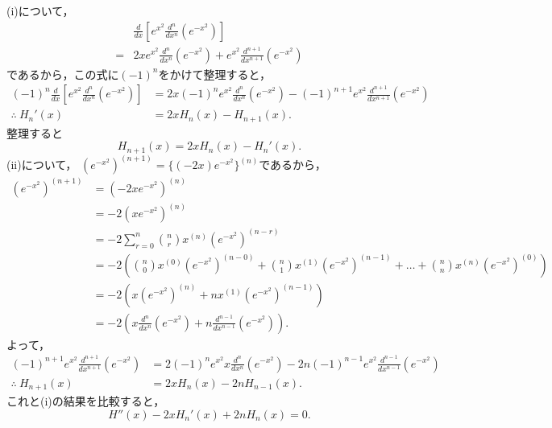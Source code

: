\begin{tproof}
    (i)について，
    \begin{align*}
          & \frac{d}{dx} \left[ e^{x^2} \frac{d^n}{dx^n} (e^{-x^2} )\right]                      \\
        = & 2x e^{x^2} \frac{d^n}{dx^n} (e^{-x^2}) + e^{x^2} \frac{d^{n+1}}{dx^{n+1}} (e^{-x^2})
    \end{align*}
    であるから，この式に$(-1)^n$をかけて整理すると，
    \begin{align*}
        (-1)^n \frac{d}{dx} \left[ e^{x^2} \frac{d^n}{dx^n} (e^{-x^2} )\right] & = 2x(-1)^n e^{x^2} \frac{d^n}{dx^n} (e^{-x^2}) -(-1)^{n+1} e^{x^2} \frac{d^{n+1}}{dx^{n+1}} (e^{-x^2}) \\
        \therefore ~ H_n ' (x)                                                 & = 2x H_n(x) - H_{n+1}(x).
    \end{align*}
    整理すると
    \[
        H_{n+1}(x) =  2x H_n(x)-H_n'(x).
    \]
    (ii)について，
    $ (e^{-x^2})^{(n+1)} = \{ (-2x)e^{-x^2} \}^{(n)}$であるから，
    \begin{align*}
        (e^{-x^2})^{(n+1)} & = (-2xe^{-x^2})^{(n)}                                                                                                                                  \\
                           & = -2 (xe^{-x^2})^{(n)}                                                                                                                                 \\
                           & = -2 \sum_{r=0}^{n} \binom{n}{r} x^{(n)} (e^{-x^2})^{(n-r)}                                                                                            \\
                           & = -2 \left ( \binom{n}{0} x^{(0)} (e^{-x^2})^{(n-0)} + \binom{n}{1} x^{(1)} (e^{-x^2})^{(n-1)} + \dots + \binom{n}{n} x^{(n)} (e^{-x^2})^{(0)} \right) \\
                           & = -2 \left(  x (e^{-x^2})^{(n)} + n x^{(1)} (e^{-x^2})^{(n-1)} \right)                                                                                 \\
                           & = -2 \left ( x \frac{d^n}{dx^n} (e^{-x^2}) + n \frac{d^{n-1}}{dx^{n-1}} (e^{-x^2}) \right).
    \end{align*}
    よって，
    \begin{align*}
        (-1)^{n+1} e^{x^2} \frac{d^{n+1}}{d x^{n+1}} (e^{-x^2}) & = 2 (-1)^n e^{x^2} x \frac{d^n}{dx^n} (e^{-x^2}) -2 n (-1)^{n-1} e^{x^2}\frac{d^{n-1}}{dx^{n-1}} (e^{-x^2}) \\
        \therefore ~ H_{n+1} (x)                                & = 2x H_n(x) - 2nH_{n-1}(x).
    \end{align*}
    これと(i)の結果を比較すると，
    \[
        H '' (x) - 2x H_n' (x) + 2nH_n (x)=0.
    \]
\end{tproof}

